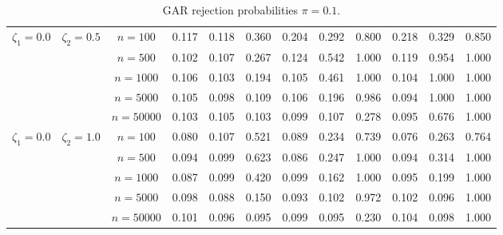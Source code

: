\documentclass[hidelinks, 11 pt, a4paper, pdflatex]{article}
\begin{document}
{\begin{landscape}
\begin{table}[h]
\begin{center}
\begin{tabular}[t]{cccccccccccc}
      \hline

      $\zeta_1=0.0$ & $\zeta_2=0.5$ & $n=100$   & 0.117 & 0.118 & 0.360 & 0.204 & 0.292 & 0.800 & 0.218 & 0.329 & 0.850  \\ [0.3cm]
                    &               & $n=500$   & 0.102 & 0.107 & 0.267 & 0.124 & 0.542 & 1.000 & 0.119 & 0.954 & 1.000  \\ [0.3cm]
                    &               & $n=1000$  & 0.106 & 0.103 & 0.194 & 0.105 & 0.461 & 1.000 & 0.104 & 1.000 & 1.000  \\ [0.3cm]
                    &               & $n=5000$  & 0.105 & 0.098 & 0.109 & 0.106 & 0.196 & 0.986 & 0.094 & 1.000 & 1.000  \\ [0.3cm]
                    &               & $n=50000$ & 0.103 & 0.105 & 0.103 & 0.099 & 0.107 & 0.278 & 0.095 & 0.676 & 1.000  \\ [0.3cm]
									
      \hline

      $\zeta_1=0.0$ & $\zeta_2=1.0$ & $n=100$   & 0.080 & 0.107 & 0.521 & 0.089 & 0.234 & 0.739 & 0.076 & 0.263 & 0.764  \\ [0.3cm]
                    &               & $n=500$   & 0.094 & 0.099 & 0.623 & 0.086 & 0.247 & 1.000 & 0.094 & 0.314 & 1.000  \\ [0.3cm]
                    &               & $n=1000$  & 0.087 & 0.099 & 0.420 & 0.099 & 0.162 & 1.000 & 0.095 & 0.199 & 1.000  \\ [0.3cm]
                    &               & $n=5000$  & 0.098 & 0.088 & 0.150 & 0.093 & 0.102 & 0.972 & 0.102 & 0.096 & 1.000  \\ [0.3cm]
                    &               & $n=50000$ & 0.101 & 0.096 & 0.095 & 0.099 & 0.095 & 0.230 & 0.104 & 0.098 & 1.000  \\ [0.3cm]
									
      \hline
      \hline
									
     \end{tabular}
    \end{center}

   \caption{GAR rejection  probabilities $\pi=0.1.$}

   \end{table}
  \end{landscape}
  						
   \vspace{0.3cm}

  \begin{landscape}
   \begin{table}[h]								
    \begin{center}
	 \begin{tabular}[t]{cccccccccccc}


\end{tabular}
\end{center}
\end{table}
\end{landscape}}
\end{document}
